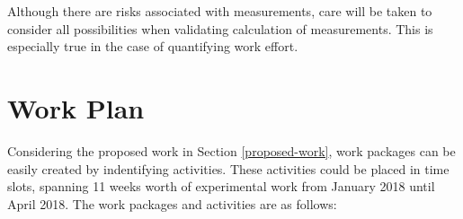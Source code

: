 \documentclass{mprop}
\begin{document}
Although there are risks associated with measurements, care will be taken to
consider all possibilities when validating calculation of measurements. This is
especially true in the case of quantifying work effort.

\section{Work Plan}
\label{work-plan}

Considering the proposed work in Section \ref{proposed-work}, work packages can
be easily created by indentifying activities. These activities could be placed
in time slots, spanning 11 weeks worth of experimental work from January 2018
until April 2018. The work packages and activities are as follows:
\end{document}
